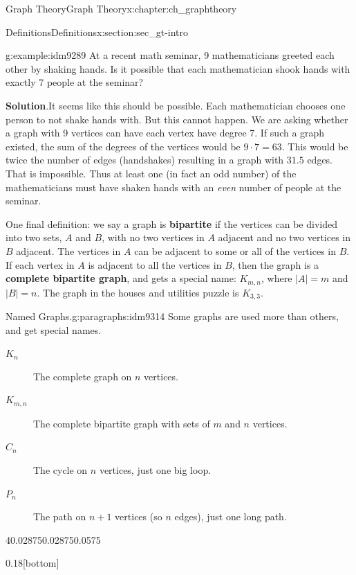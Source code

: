 \documentclass[oneside,10pt,]{book}
\newcommand{\terminology}[1]{\textbf{#1}}
\numberwithin{equation}{chapter}
\begin{document}
\begin{chapterptx}{Graph Theory}{}{Graph Theory}{}{}{x:chapter:ch_graphtheory}
\begin{sectionptx}{Definitions}{}{Definitions}{}{}{x:section:sec_gt-intro}
\begin{example}{}{g:example:idm9289}%
At a recent math seminar, 9 mathematicians greeted each other by shaking hands. Is it possible that each mathematician shook hands with exactly 7 people at the seminar?%
\par\smallskip%
\noindent\textbf{Solution}.\hypertarget{g:solution:idm9292}{}\quad{}It seems like this should be possible. Each mathematician chooses one person to not shake hands with. But this cannot happen. We are asking whether a graph with 9 vertices can have each vertex have degree 7. If such a graph existed, the sum of the degrees of the vertices would be \(9\cdot 7 = 63\). This would be twice the number of edges (handshakes) resulting in a graph with \(31.5\) edges. That is impossible. Thus at least one (in fact an odd number) of the mathematicians must have shaken hands with an \emph{even} number of people at the seminar.%
\end{example}
One final definition: we say a graph is \terminology{bipartite} if the vertices can be divided into two sets, \(A\) and \(B\), with no two vertices in \(A\) adjacent and no two vertices in \(B\) adjacent. The vertices in \(A\) can be adjacent to some or all of the vertices in \(B\). If each vertex in \(A\) is adjacent to all the vertices in \(B\), then the graph is a \terminology{complete bipartite graph}, and gets a special name: \(K_{m,n}\), where \(|A| = m\) and \(|B| = n\). The graph in the houses and utilities puzzle is \(K_{3,3}\).%
\begin{paragraphs}{Named Graphs.}{g:paragraphs:idm9314}%
Some graphs are used more than others, and get special names.%
\begin{description}
\item[{\(K_n\)}]The complete graph on \(n\) vertices.\label{g:notation:idm9323}%
\item[{\(K_{m,n}\)}]The complete bipartite graph with sets of \(m\) and \(n\) vertices. \label{g:notation:idm9333}%
\item[{\(C_n\)}]The cycle on \(n\) vertices, just one big loop. \label{g:notation:idm9343}%
\item[{\(P_n\)}]The path on \(n+1\) vertices (so \(n\) edges), just one long path. \label{g:notation:idm9353}%
\end{description}
%
\begin{sidebyside}{4}{0.02875}{0.02875}{0.0575}%
\begin{sbspanel}{0.18}[bottom]%
\resizebox{\linewidth}{!}{%
				\begin{tikzpicture}[scale=1]

\end{tikzpicture}}
\end{sbspanel}
\end{sidebyside}
\end{paragraphs}
\end{sectionptx}
\end{chapterptx}
\end{document}
